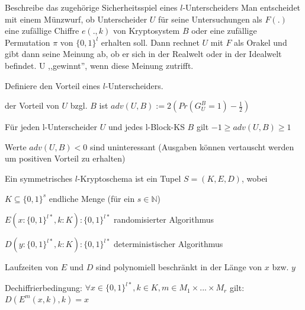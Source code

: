 \documentclass[avery5371, frame]{flashcards}
\begin{document}
\begin{flashcard}{Beschreibe das zugehörige Sicherheitsspiel eines $l$-Unterscheiders}
    Man entscheidet mit einem Münzwurf, ob Unterscheider $U$ für seine Untersuchungen als $F(.)$ eine zufällige Chiffre $e(.,k)$ von Kryptosystem $B$ oder eine zufällige Permutation $\pi$ von $\{0,1\}^l$ erhalten soll. Dann rechnet $U$ mit $F$ als Orakel und gibt dann seine Meinung ab, ob er sich in der Realwelt oder in der Idealwelt befindet. U ,,gewinnt'', wenn diese Meinung zutrifft.
\end{flashcard}

\begin{flashcard}{Definiere den Vorteil eines $l$-Unterscheiders.}
    \begin{itemize*}
        \item der Vorteil von $U$ bzgl. $B$ ist $adv(U,B):= 2(Pr(G^B_U=1)-\frac{1}{2})$
        \item Für jeden l-Unterscheider $U$ und jedes l-Block-KS $B$ gilt $-1\geq adv(U,B)\geq 1$
        \item Werte $adv(U,B)<0$ sind uninteressant (Ausgaben können vertauscht werden um positiven Vorteil zu erhalten)
    \end{itemize*}
\end{flashcard}

\begin{flashcard}{Ein symmetrisches $l$-Kryptoschema ist ein Tupel $S= (K,E,D)$, wobei}
    \begin{itemize*}
        \item $K\subseteq\{0,1\}^s$ endliche Menge (für ein $s\in\mathbb{N}$)
        \item $E(x:\{0,1\}^{l*},k:K) :\{0,1\}^{l*}$ randomisierter Algorithmus
        \item $D(y:\{0,1\}^{l*},k:K) :\{0,1\}^{l*}$ deterministischer Algorithmus
        \item Laufzeiten von $E$ und $D$ sind polynomiell beschränkt in der Länge von $x$ bzw. $y$
        \item Dechiffrierbedingung: $\forall x\in\{0,1\}^{l*},k\in K,m\in M_1\times...\times M_r$ gilt: $D(E^m(x,k),k)=x$
    \end{itemize*}
\end{flashcard}
\end{document}
